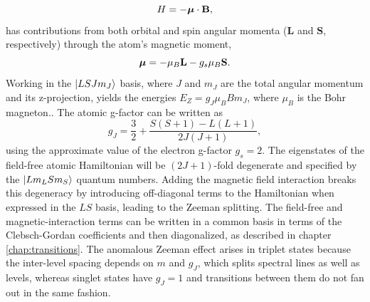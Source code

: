 	\begin{equation}
		H = -\text{\boldmath$\mu$}\cdot \textbf{B},
	\end{equation}
	has contributions from both orbital and spin angular momenta ($\textbf{L}$ and $\textbf{S}$, respectively) through the atom's magnetic moment,
	\begin{equation}
		\text{\boldmath$\mu$} = -\mu_B\textbf{L} - g_s\mu_B \textbf{S}.
	\end{equation}
	Working in the $|LSJm_J\rangle$ basis, where $J$ and $m_J$ are the total angular momentum and its z-projection, yields the energies $E_Z = g_J \mu_B B m_J$, where $\mu_B$ is the Bohr magneton..
	The atomic g-factor can be written as
	\begin{equation}
		g_J = \frac{3}{2} + \frac{S(S+1)-L(L+1)}{2J(J+1)},
	\end{equation}
	using the approximate value of the electron g-factor $g_s=2$.
	The eigenstates of the field-free atomic Hamiltonian will be $(2J+1)$-fold degenerate and specified by the $|Lm_L S m_S\rangle$ quantum numbers.
	Adding the magnetic field interaction breaks this degeneracy by introducing off-diagonal terms to the Hamiltonian when expressed in the $LS$ basis,  leading to the Zeeman splitting.
	The field-free and magnetic-interaction terms can be written in a common basis in terms of the Clebsch-Gordan coefficients and then diagonalized, as described in chapter \ref{chap:transitions}.
	The anomalous Zeeman effect arises in triplet states because the inter-level spacing depends on $m$ and $g_J$, which splits spectral lines as well as levels, whereas singlet states have $g_J=1$ and transitions between them do not fan out in the same fashion.
	
	

	


